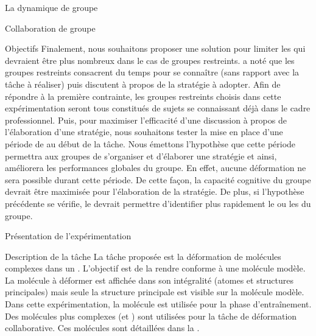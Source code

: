 \documentclass[myfrancais]{mythesis}
\begin{document}
\begin{mychapter}{La dynamique de groupe}
\begin{mysection}{Collaboration de groupe}
\begin{mysubsection}{Objectifs}
				Finalement, nous souhaitons proposer une solution pour limiter les  qui devraient être plus nombreux dans le cas de groupes restreints.
				 a noté que les groupes restreints consacrent du temps pour se connaître (sans rapport avec la tâche à réaliser) puis discutent à propos de la stratégie à adopter.
				Afin de répondre à la première contrainte, les groupes restreints choisis dans cette expérimentation seront tous constitués de sujets se connaissant déjà dans le cadre professionnel.
				Puis, pour maximiser l'efficacité d'une discussion à propos de l'élaboration d'une stratégie, nous souhaitons tester la mise en place d'une période de \mybrainstorming au début de la tâche.
				Nous émettons l'hypothèse que cette période permettra aux groupes de s'organiser et d'élaborer une stratégie et ainsi, améliorera les performances globales du groupe.
				En effet, aucune déformation ne sera possible durant cette période.
				De cette façon, la capacité cognitive du groupe devrait être maximisée pour l'élaboration de la stratégie.
				De plus, si l'hypothèse précédente se vérifie, le \mybrainstorming devrait permettre d'identifier plus rapidement le ou les  du groupe.
			\end{mysubsection}
		\end{mysection}
		\begin{mysection}{Présentation de l'expérimentation}
			\begin{mysubsection}{Description de la tâche}
				La tâche proposée est la déformation de molécules complexes dans un .
				L'objectif est de la rendre conforme à une molécule modèle.
				La molécule à déformer est affichée dans son intégralité (atomes et structures principales) mais seule la structure principale est visible sur la molécule modèle.
				Dans cette expérimentation, la molécule \myTRPCAGE est utilisée pour la phase d'entraînement.
				Des molécules plus complexes (\myPrion et \myUbiquitin) sont utilisées pour la tâche de déformation collaborative.
				Ces molécules sont détaillées dans la .


\end{mysubsection}
\end{mysection}
\end{mychapter}
\end{document}
